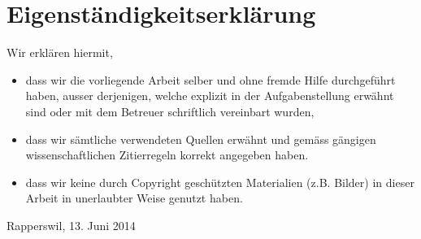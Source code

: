 \section{Eigenständigkeitserklärung}
Wir erklären hiermit, 
\begin{itemize}


\item	dass wir die vorliegende Arbeit selber und ohne fremde Hilfe durchgeführt haben, ausser derjenigen, welche explizit in der Aufgabenstellung erwähnt sind oder mit dem Betreuer schriftlich vereinbart wurden,
\item	dass wir sämtliche verwendeten Quellen erwähnt und gemäss gängigen wissenschaftlichen Zitierregeln korrekt angegeben haben.
\item dass wir keine durch Copyright geschützten Materialien (z.B. Bilder) in dieser Arbeit in unerlaubter Weise genutzt haben. 

\end{itemize}

\vspace{4mm}

Rapperswil, 13. Juni 2014

\vspace{6mm}

